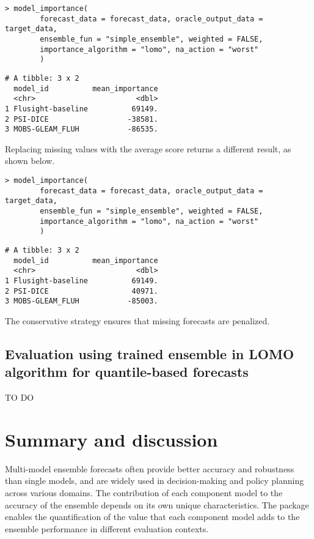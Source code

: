 \documentclass[
  article,
  shortnames,
  notitle]{jss}
\begin{document}
\begin{verbatim}
> model_importance(
        forecast_data = forecast_data, oracle_output_data = target_data,
        ensemble_fun = "simple_ensemble", weighted = FALSE,
        importance_algorithm = "lomo", na_action = "worst"
        )
\end{verbatim}

\small

\begin{verbatim}
# A tibble: 3 x 2
  model_id          mean_importance
  <chr>                       <dbl>
1 Flusight-baseline          69149.
2 PSI-DICE                  -38581.
3 MOBS-GLEAM_FLUH           -86535.
\end{verbatim}

\normalsize

Replacing missing values with the average score returns a different
result, as shown below.

\begin{verbatim}
> model_importance(
        forecast_data = forecast_data, oracle_output_data = target_data,
        ensemble_fun = "simple_ensemble", weighted = FALSE,
        importance_algorithm = "lomo", na_action = "worst"
        )
\end{verbatim}

\small

\begin{verbatim}
# A tibble: 3 x 2
  model_id          mean_importance
  <chr>                       <dbl>
1 Flusight-baseline          69149.
2 PSI-DICE                   40971.
3 MOBS-GLEAM_FLUH           -85003.
\end{verbatim}

\normalsize

The conservative strategy ensures that missing forecasts are penalized.

\subsection{Evaluation using trained ensemble in LOMO algorithm for
quantile-based forecasts}\label{sec:trained-lomo-qntl}

TO DO

\section{Summary and discussion}\label{sec:discussion}

Multi-model ensemble forecasts often provide better accuracy and
robustness than single models, and are widely used in decision-making
and policy planning across various domains. The contribution of each
component model to the accuracy of the ensemble depends on its own
unique characteristics. The  package enables the
quantification of the value that each component model adds to the
ensemble performance in different evaluation contexts.
\end{document}
